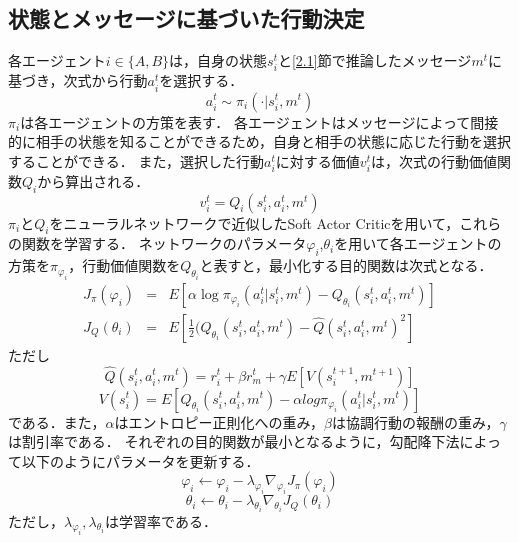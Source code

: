 \documentclass[twocolumn,a4j]{jarticle}
\begin{document}
\subsection{状態とメッセージに基づいた行動決定}
\label{2.2}
各エージェント$i \in \{A,B\}$は，自身の状態$s^t_{i}$と\ref{2.1}節で推論したメッセージ$m^t$に基づき，次式から行動$a^t_{i}$を選択する．
%
\begin{equation}
a^t_{i} \sim \pi_{i}(\cdot | s^t_{i}, m^t) \label{eq:action}
\end{equation}
%
$\pi_{i}$は各エージェントの方策を表す．
各エージェントはメッセージによって間接的に相手の状態を知ることができるため，自身と相手の状態に応じた行動を選択することができる．
また，選択した行動$a^t_{i}$に対する価値$v^t_{i}$は，次式の行動価値関数$Q_{i}$から算出される．
%
\begin{equation}
v^t_{i} = Q_{i}( s^t_{i}, a^t_{i}, m^t) \label{eq:value}
\end{equation}
%
$\pi_i$と$Q_i$をニューラルネットワークで近似したSoft Actor Criticを用いて，これらの関数を学習する．
ネットワークのパラメータ$\varphi_{i}$,$\theta_{i}$を用いて各エージェントの方策を$\pi_{\varphi_{i}}$，行動価値関数を$Q_{\theta_{i}}$と表すと，最小化する目的関数は次式となる．
%
\small
\begin{eqnarray}
J_{\pi}(\varphi_{i}) &=& E[ \alpha \log\pi_{\varphi_{i}}(a^t_{i} | s^t_{i}, m^t)-Q_{\theta_{i}}(s^t_{i},a^t_{i},m^t) ] \\ 
J_{Q}(\theta_{i}) &=& E[\frac{1}{2}(Q_{\theta_{i}}(s^{t}_{i},a^{t}_{i},m^{t}) - \hat{Q}(s^{t}_{i},a^{t}_{i},m^{t})^2]  
\end{eqnarray}
\normalsize
%
ただし
%
\small
\begin{equation}
\hat{Q}(s^{t}_{i},a^{t}_{i},m^{t}) = r^t_{i} + \beta r^t_{m} + \gamma E[V(s^{t+1}_{i}, m^{t+1})] \label{beta}
\end{equation}
%
\begin{equation}
V(s^t_{i}) = E [Q_{\theta_{i}}(s^{t}_{i},a^{t}_{i},m^{t}) - \alpha log \pi_{\varphi_{i}}(a^t_{i} | s^t_{i}, m^t) ]
\end{equation}
\normalsize
%
である．また，$\alpha$はエントロピー正則化への重み，$\beta$は協調行動の報酬の重み，$\gamma$は割引率である．
それぞれの目的関数が最小となるように，勾配降下法によって以下のようにパラメータを更新する．
%
\begin{equation}
\varphi_{i} 	\leftarrow \varphi_{i} - \lambda_{\varphi_{i}} \nabla_{\varphi_{i}} J_{\pi}(\varphi_{i})
\end{equation}
%
\begin{equation}
\theta_{i} 	\leftarrow \theta_{i} - \lambda_{\theta_{i}} \nabla_{\theta_{i}} J_{Q}(\theta_{i})
\end{equation}
%
ただし，$\lambda_{\varphi_{i}}, \lambda_{\theta_{i}}$は学習率である．
\end{document}
